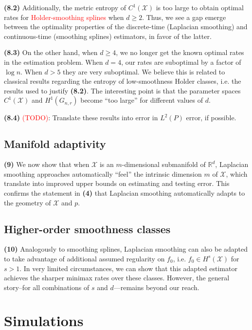 \documentclass{article}
\newcommand{\Reals}{\mathbb{R}}
\newcommand{\1}{\mathbf{1}}
\newcommand{\Xset}{\mathcal{X}}
\newcommand{\Leb}{L}
\newcommand{\mc}[1]{\mathcal{#1}}
\theoremstyle{alden}
\theoremstyle{aldenthm}
\theoremstyle{definition}
\theoremstyle{remark}
\begin{document}
\quad \textbf{(8.2)} Additionally, the metric entropy of $C^1(\Xset)$ is too large to obtain optimal rates for \textcolor{red}{Holder-smoothing splines} when $d \geq 2$. Thus, we see a gap emerge between the optimality properties of the discrete-time (Laplacian smoothing) and continuous-time (smoothing splines) estimators, in favor of the latter.

\quad \textbf{(8.3)} On the other hand, when $d \geq 4$, we no longer get the known optimal rates in the estimation problem. When $d = 4$, our rates are suboptimal by a factor of $\log n$. When $d > 5$ they are very suboptimal. We believe this is related to classical results regarding the entropy of low-smoothness Holder classes, i.e. the results used to justify \textbf{(8.2)}. The interesting point is that the parameter spaces $C^1(\Xset)$ and $H^1(G_{n,r})$ become ``too large'' for different values of $d$.
 
\quad \textbf{(8.4)} \textcolor{red}{(TODO)}: Translate these results into error in $\Leb^2(P)$ error, if possible. 

\subsection{Manifold adaptivity}

\quad \textbf{(9)} We now show that when $\Xset$ is an $m$-dimensional submanifold of $\Reals^d$, Laplacian smoothing approaches automatically ``feel'' the intrinsic dimension $m$ of $\Xset$, which translate into improved upper bounds on estimating and testing error. This confirms the statement in \textbf{(4)} that Laplacian smoothing automatically adapts to the geometry of $\Xset$ and $p$. 

\subsection{Higher-order smoothness classes}

\quad \textbf{(10)} Analogously to smoothing splines, Laplacian smoothing can also be adapted to take advantage of additional assumed regularity on $f_0$, i.e. $f_0 \in H^s(\mc{\Xset})$ for $s > 1$. In very limited circumstances, we can show that this adapted estimator achieves the sharper minimax rates over these classes. However, the general story--for all combinations of $s$ and $d$---remains beyond our reach.

\section{Simulations}
\end{document}
